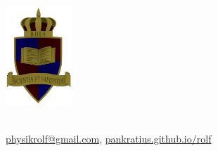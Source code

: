 \documentclass[a4paper]{article}
\begin{document}
	\vspace*{-2cm}
	\parbox{4cm}{\includegraphics[width=2.5cm]{../images/ROLF4.png}}
	\parbox{10.6cm}{ \\ \href{mailto:physikrolf@gmail.com}{physikrolf@gmail.com}, \url{pankratius.github.io/rolf} \\ \vspace*{-.5cm} }
	
	

\thispagestyle{empty}


\noindent








%
%
\end{document}
